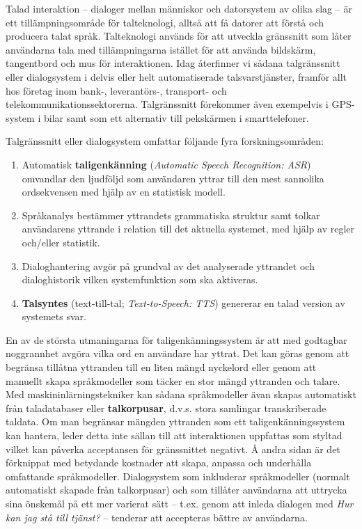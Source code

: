 \begin{multicols}{2}
Talad interaktion -- dialoger mellan människor och datorsystem av
olika slag -- är ett tillämpningsområde för talteknologi, alltså att
få datorer att förstå och producera talat språk. Talteknologi används
för att utveckla gränssnitt som låter användarna tala med
tillämpningarna istället för att använda bildskärm, tangentbord och
mus för interaktionen. Idag återfinner vi sådana talgränssnitt eller
dialogsystem i delvis eller helt automatiserade talsvarstjänster,
framför allt hos företag inom \mbox{bank-,} leverantörs-, transport-
och telekommunikationssektorerna. Talgränssnitt förekommer även
exempelvis i GPS-system i bilar samt som ett alternativ till
pek\-skärm\-en i smarttelefoner.

Talgränssnitt eller dialogsystem omfattar följande fyra
forskningsområden:

\begin{enumerate}[itemsep=0pt,parsep=0pt]
\item Automatisk \textbf{taligenkänning} (\emph{Automatic Speech
  Recognition: ASR}) omvandlar den ljudföljd som användaren yttrar
  till den mest sannolika ordsekvensen med hjälp av en statistisk
  modell.
\item Språkanalys bestämmer yttrandets grammatiska struktur samt
  tolkar användarens yttrande i relation till det aktuella systemet,
  med hjälp av regler och/eller statistik.
\item Dialoghantering avgör på grundval av det analyserade yttrandet
  och dialoghistorik vilken systemfunktion som ska aktiveras.
\item \textbf{Talsyntes} (text-till-tal; \emph{Text-to-Speech: TTS})
  genererar en talad version av systemets svar.
\end{enumerate}

En av de största utmaningarna för taligenkänningssystem är att med
godtagbar noggrannhet avgöra vilka ord en användare har yttrat. Det
kan göras genom att begränsa tillåtna yttranden till en liten mängd
nyckelord eller genom att manuellt skapa språkmodeller som täcker en
stor mängd yttranden och talare. Med maskininlärningstekniker kan
sådana språkmodeller ävan skapas automatiskt från taladatabaser eller
\textbf{talkorpusar}, d.v.s. stora samlingar transkriberade
taldata. Om man begränsar mängden yttranden som ett
taligenkänningssystem kan hantera, leder detta inte sällan till att
interaktionen uppfattas som styltad vilket kan påverka acceptansen för
gränssnittet negativt. Å andra sidan är det förknippat med betydande
kostnader att skapa, anpassa och underhålla omfattande
språkmodeller. Dialogsystem som inkluderar språkmodeller (normalt
automatiskt skapade från talkorpusar) och som tillåter användarna att
uttrycka sina önskemål på ett mer varierat sätt -- t.ex. genom att
inleda dialogen med \textit{Hur kan jag stå till tjänst?} -- tenderar
att accepteras bättre av användarna.


\end{multicols}
